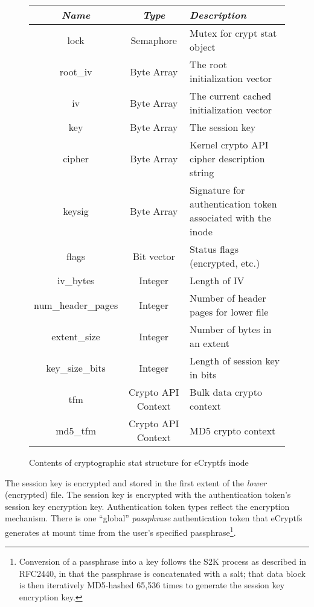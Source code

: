 \documentclass{article}
\begin{document}
\begin{figure*}[t]
  \begin{center}
    \begin{tabular}{|c|c|p{2in}|}
      \hline
      \emph{Name} & \emph{Type} & \emph{Description} \\
      \hline
      lock & Semaphore & Mutex for crypt stat object \\
      \hline
      root\_iv & Byte Array & The root initialization vector \\
      \hline
      iv & Byte Array & The current cached initialization vector \\
      \hline
      key & Byte Array & The session key \\
      \hline
      cipher & Byte Array & Kernel crypto API cipher description
      string \\
      \hline
      keysig & Byte Array & Signature for authentication
      token associated with the inode \\
      \hline
      flags & Bit vector & Status flags (encrypted, etc.) \\
      \hline
      iv\_bytes & Integer & Length of IV \\
      \hline
      num\_header\_pages & Integer & Number of header pages for
      lower file \\
      \hline
      extent\_size & Integer & Number of bytes in an extent \\
      \hline
      key\_size\_bits & Integer & Length of session key in bits \\
      \hline
      tfm & Crypto API Context & Bulk data crypto context \\
      \hline
      md5\_tfm & Crypto API Context & MD5 crypto context \\
      \hline
    \end{tabular}
    \caption{Contents of cryptographic stat structure for eCryptfs inode}
    \label{comp_fig}
  \end{center}
\end{figure*}
    
The session key is encrypted and stored in the first extent of the
\emph{lower} (encrypted) file. The session key is encrypted with the
authentication token's session key encryption key. Authentication
token types reflect the encryption mechanism. There is one ``global''
\emph{passphrase} authentication token that eCryptfs generates at
mount time from the user's specified passphrase\footnote{Conversion of
a passphrase into a key follows the S2K process as described in
RFC2440, in that the passphrase is concatenated with a salt; that data
block is then iteratively MD5-hashed 65,536 times to generate the
session key encryption key.}.
\end{document}
